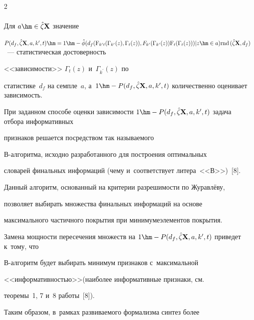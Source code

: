 \begin{multicols}{2}
\begin{multline*}
\end{multline*}



 Для $a\hm\in \hat{\zeta} \mathbf{X}$ значение 

${P}(d_f, \hat{\zeta}\mathbf{X}, a, k^\prime, t)\hm= 1\hm-

\hat{\phi}(d_f(\mathrm{F}_{k^\prime t}(\Gamma_{k^\prime}(z), \Gamma_t(z)), F_{k^\prime}(\Gamma_{k^\prime}(z)) 

\mathrm{F}_t(\Gamma_t(z)))\vert z\hm\in a) \mathrm{rnd}\,(\hat{\zeta}\mathbf{X}, d_f)$~--- статистическая достоверность 

<<зависимости>> $\Gamma_t(z)$ и~$\Gamma_{k^\prime}(z)$ по 

статистике~$d_f$ на семпле~$a$, а~$1\hm- P(d_f, 

\hat{\zeta}\mathbf{X}, a, k^\prime, t)$ количественно оценивает зависимость.

    



При заданном способе оценки зависимости $1\hm- P(d_f, 

\hat{\zeta}\mathbf{X}, a, k^\prime, t)$ задача отбора информативных 

признаков решается посредством так называемого\linebreak  

В-ал\-го\-рит\-ма, исходно разработанного для построения оптимальных 

словарей финальных ин\-фор\-маций (чему и~соответствует литера~<<В>>)~[8]. 

\mbox{Данный} алгоритм, основанный на критерии раз\-ре\-ши\-мости по Журавлёву, 

позволяет выбирать множества финальных информаций на основе 

максимального час\-тич\-но\-го покрытия при минимуме\linebreak элементов покрытия. 

Замена мощности пересечения множеств на $1\hm- P(d_f, 

\hat{\zeta}\mathbf{X}, a, k^\prime, t)$ приведет к~тому, что  

В-ал\-го\-ритм будет выбирать минимум признаков с~максимальной 

<<информативностью>>\linebreak (наиболее информативные признаки, см.\ 

теоремы~1, 7  и~8 работы~[8]).



    Таким образом, в~рамках развиваемого формализма синтез более 


\end{multicols}
